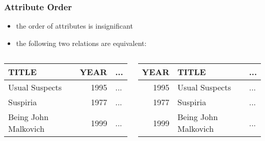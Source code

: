 \documentclass[dvipsnames]{beamer}
\theoremstyle{plain}
\begin{document}
\begin{frame}
  \frametitle{Attribute Order}

  \begin{itemize}
    \item the order of attributes is insignificant
  \end{itemize}

  \pause
  \begin{example}
    \begin{itemize}
      \item the following two relations are equivalent:
    \end{itemize}

    \begin{columns}
      \begin{tiny}
      \begin{table}
        \begin{tabular}{|l|r|l|}\hline
TITLE                & YEAR & ... \\\hline\hline
Usual Suspects       & 1995 & ... \\\hline
Suspiria             & 1977 & ... \\\hline
Being John Malkovich & 1999 & ... \\\hline
        \end{tabular}
      \end{table}
      \end{tiny}

      \begin{tiny}
      \begin{table}
        \begin{tabular}{|r|l|l|}\hline
YEAR & TITLE                & ... \\\hline\hline
1995 & Usual Suspects       & ... \\\hline
1977 & Suspiria             & ... \\\hline
1999 & Being John Malkovich & ... \\\hline
        \end{tabular}
      \end{table}
      \end{tiny}
    \end{columns}
  \end{example}
\end{frame}
\end{document}
